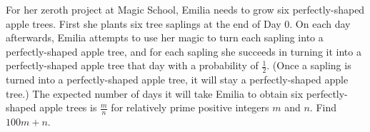 For her zeroth project at Magic School, Emilia needs to grow six perfectly-shaped apple trees. First she plants six tree saplings at the end of Day $0$. On each day afterwards, Emilia attempts to use her magic to turn each sapling into a perfectly-shaped apple tree, and for each sapling she succeeds in turning it into a perfectly-shaped apple tree that day with a probability of $\frac{1}{2}$. (Once a sapling is turned into a perfectly-shaped apple tree, it will stay a perfectly-shaped apple tree.) The expected number of days it will take Emilia to obtain six perfectly-shaped apple trees is $\frac{m}{n}$ for relatively prime positive integers $m$ and $n$. Find $100m+n$.
